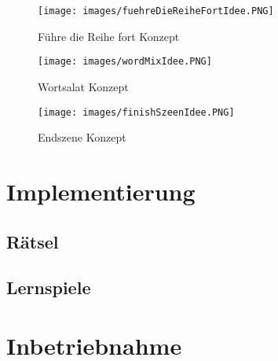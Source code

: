 \begin{figure}[htbp]
  \centering
  \texttt{[image: images/fuehreDieReiheFortIdee.PNG]}
  \caption{Führe die Reihe fort Konzept}
  \label{FuehreDieReiheKonzept}
\end{figure}

\begin{figure}[htbp]
  \centering
  \texttt{[image: images/wordMixIdee.PNG]}
  \caption{Wortsalat Konzept}
  \label{WortSalatKonzept}
\end{figure}

\begin{figure}[htbp]
  \centering
  \texttt{[image: images/finishSzeenIdee.PNG]}
  \caption{Endszene Konzept}
  \label{EndSzeneKonzept}
\end{figure}
\chapter{Implementierung}
\label{cha:implementierung}
\section{Rätsel}
\label{sec:raetsel}

\newpage
\section{Lernspiele}
\label{sec:lernspiele}

\chapter{Inbetriebnahme}
\label{cha:inbetriebnahme}

